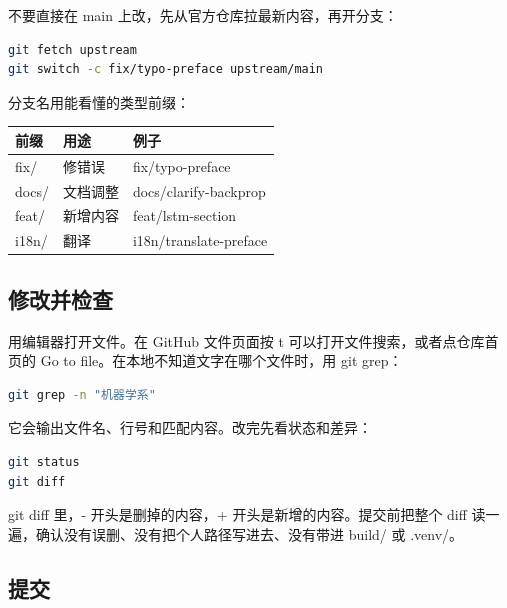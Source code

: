 \documentclass[UTF8,fontset=none,a4paper,11pt]{ctexart}
\newcommand{\code}[1]{{\CJKsetecglue{}\ttfamily #1}}
\begin{document}
不要直接在 \code{main} 上改，先从官方仓库拉最新内容，再开分支：

\begin{lstlisting}[language=bash]
git fetch upstream
git switch -c fix/typo-preface upstream/main
\end{lstlisting}

分支名用能看懂的类型前缀：

\begin{center}
\small
\begin{tabularx}{\linewidth}{@{}L{2.2cm}L{3.6cm}Y@{}}
\toprule
前缀 & 用途 & 例子 \\
\midrule
\code{fix/} & 修错误 & \code{fix/typo-preface} \\
\code{docs/} & 文档调整 & \code{docs/clarify-backprop} \\
\code{feat/} & 新增内容 & \code{feat/lstm-section} \\
\code{i18n/} & 翻译 & \code{i18n/translate-preface} \\
\bottomrule
\end{tabularx}
\end{center}

\subsection{修改并检查}\label{sec:edit-and-check}

用编辑器打开文件。在 GitHub 文件页面按 \code{t} 可以打开文件搜索，或者点仓库首页的 \code{Go to file}。在本地不知道文字在哪个文件时，用 \code{git grep}：

\begin{lstlisting}[language=bash]
git grep -n "机器学系"
\end{lstlisting}

它会输出文件名、行号和匹配内容。改完先看状态和差异：

\begin{lstlisting}[language=bash]
git status
git diff
\end{lstlisting}

\code{git diff} 里，\code{-} 开头是删掉的内容，\code{+} 开头是新增的内容。提交前把整个 diff 读一遍，确认没有误删、没有把个人路径写进去、没有带进 \code{build/} 或 \code{.venv/}。

\subsection{提交}\label{sec:commit}
\end{document}
